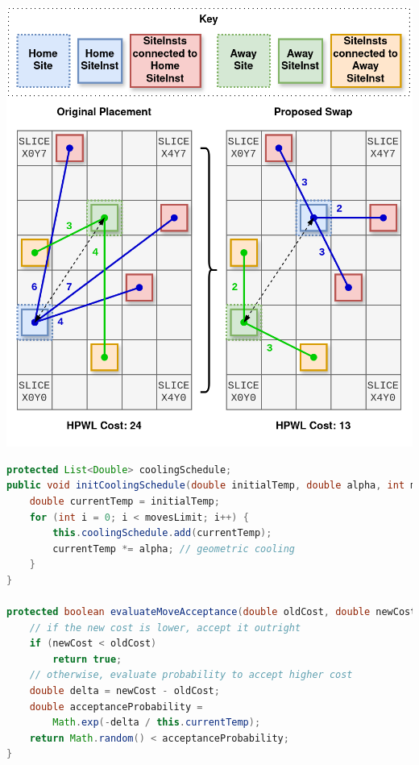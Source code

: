 {
    \centering
    \includegraphics[width=\columnwidth]{figures/placement/swapSingleSite.png}
    \label{fig:swapSingleSite}
}
\vfill

\begin{lstlisting}[language=java, caption={Cooling Schedule and Move Acceptance with Temperature}, label={lst:sa_acceptance}]
protected List<Double> coolingSchedule;
public void initCoolingSchedule(double initialTemp, double alpha, int movesLimit) {
    double currentTemp = initialTemp;
    for (int i = 0; i < movesLimit; i++) {
        this.coolingSchedule.add(currentTemp);
        currentTemp *= alpha; // geometric cooling
    }
}

protected boolean evaluateMoveAcceptance(double oldCost, double newCost) {
    // if the new cost is lower, accept it outright
    if (newCost < oldCost)
        return true;
    // otherwise, evaluate probability to accept higher cost
    double delta = newCost - oldCost;
    double acceptanceProbability = 
        Math.exp(-delta / this.currentTemp);
    return Math.random() < acceptanceProbability;
}
\end{lstlisting}


